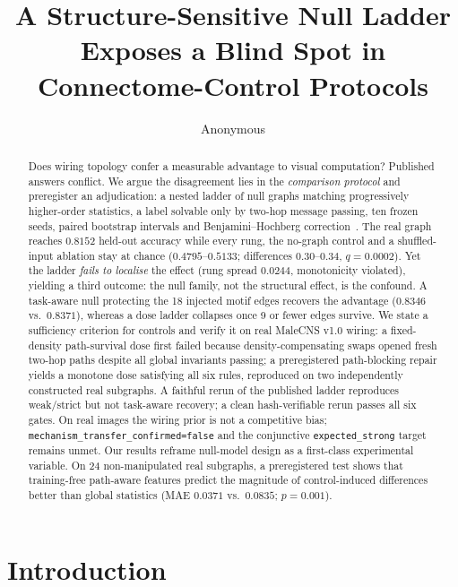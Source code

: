 \documentclass[10pt,twocolumn,letterpaper]{article}
\title{A Structure-Sensitive Null Ladder Exposes a Blind Spot in\\ Connectome-Control Protocols}
\author{Anonymous}
\begin{document}
\maketitle

\begin{abstract}
Does wiring topology confer a measurable advantage to visual computation?
Published answers conflict. We argue the disagreement lies in the
\emph{comparison protocol} and preregister an adjudication: a nested ladder of
null graphs matching progressively higher-order statistics, a label solvable
only by two-hop message passing, ten frozen seeds, paired bootstrap intervals
and Benjamini--Hochberg correction~\cite{benjamini1995}. The real graph reaches
$0.8152$ held-out accuracy while every rung, the no-graph control and a
shuffled-input ablation stay at chance ($0.4795$--$0.5133$; differences
$0.30$--$0.34$, $q=0.0002$). Yet the ladder \emph{fails to localise} the
effect (rung spread $0.0244$, monotonicity violated), yielding a third
outcome: the null family, not the structural effect, is the confound. A
task-aware null protecting the 18 injected motif edges recovers the advantage
($0.8346$ vs.\ $0.8371$), whereas a dose ladder collapses once 9 or fewer
edges survive. We state a sufficiency criterion for controls and verify it on
real MaleCNS v1.0 wiring: a fixed-density path-survival dose first failed
because density-compensating swaps opened fresh two-hop paths despite all
global invariants passing; a preregistered path-blocking repair yields a
monotone dose satisfying all six rules, reproduced on two independently
constructed real subgraphs. A faithful rerun of the published ladder
reproduces weak/strict but not task-aware recovery; a clean hash-verifiable
rerun passes all six gates. On real images the wiring prior is not a
competitive bias; \texttt{mechanism\_transfer\_confirmed=false} and the
conjunctive \texttt{expected\_strong} target remains unmet. Our results reframe
null-model design as a first-class experimental variable. On 24
non-manipulated real subgraphs, a preregistered test shows that training-free
path-aware features predict the magnitude of control-induced differences
better than global statistics (MAE $0.0371$ vs.\ $0.0835$; $p=0.001$).
\end{abstract}









\section{Introduction}
\label{sec:intro}
\end{document}
